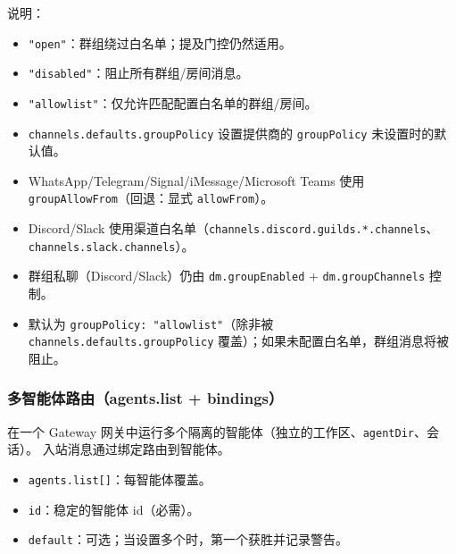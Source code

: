 说明：

\begin{itemize}
  \item \texttt{"open"}：群组绕过白名单；提及门控仍然适用。
  \item \texttt{"disabled"}：阻止所有群组/房间消息。
  \item \texttt{"allowlist"}：仅允许匹配配置白名单的群组/房间。
  \item \texttt{channels.defaults.groupPolicy} 设置提供商的 \texttt{groupPolicy} 未设置时的默认值。
  \item WhatsApp/Telegram/Signal/iMessage/Microsoft Teams 使用 \texttt{groupAllowFrom}（回退：显式 \texttt{allowFrom}）。
  \item Discord/Slack 使用渠道白名单（\texttt{channels.discord.guilds.*.channels}、\texttt{channels.slack.channels}）。
  \item 群组私聊（Discord/Slack）仍由 \texttt{dm.groupEnabled} + \texttt{dm.groupChannels} 控制。
  \item 默认为 \texttt{groupPolicy: "allowlist"}（除非被 \texttt{channels.defaults.groupPolicy} 覆盖）；如果未配置白名单，群组消息将被阻止。
\end{itemize}


\subsubsection{多智能体路由（agents.list + bindings）}


在一个 Gateway 网关中运行多个隔离的智能体（独立的工作区、\texttt{agentDir}、会话）。
入站消息通过绑定路由到智能体。

\begin{itemize}
  \item \texttt{agents.list[]}：每智能体覆盖。
  \item \texttt{id}：稳定的智能体 id（必需）。
  \item \texttt{default}：可选；当设置多个时，第一个获胜并记录警告。
\end{itemize}

